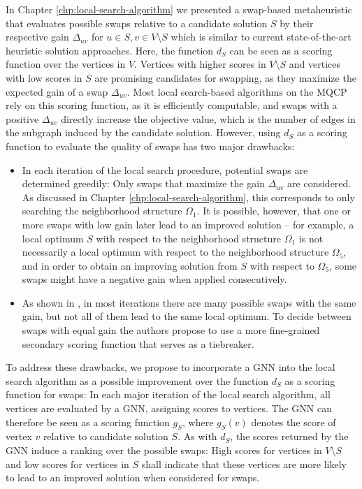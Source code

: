 \documentclass[draft,final]{vutinfth} %
\begin{document}
In Chapter \ref{chp:local-search-algorithm} we presented a swap-based metaheuristic that evaluates possible swaps relative to a candidate solution $S$ by their respective gain $\Delta_{uv}$ for $u \in S, v \in V \setminus S$ which is similar to current state-of-the-art heuristic solution approaches. 
Here, the function $d_S$ can be seen as a scoring function over the vertices in $V$. Vertices with higher scores in $V \setminus S$ and vertices with low scores in $S$ are promising candidates for swapping, as they maximize the expected gain of a swap $\Delta_{uv}$. 
Most local search-based algorithms on the MQCP rely on this scoring function, as it is efficiently computable, and swaps with a positive $\Delta_{uv}$ directly increase the objective value, which is the number of edges in the subgraph induced by the candidate solution. 
However, using $d_S$ as a scoring function to evaluate the quality of swaps has two major drawbacks:
\begin{itemize}
    \item In each iteration of the local search procedure, potential swaps are determined greedily: Only swaps that maximize the gain $\Delta_{uv}$ are considered. As discussed in Chapter \ref{chp:local-search-algorithm}, this corresponds to only searching the neighborhood structure $\Omega_1$. It is possible, however, that one or more swaps with low gain later lead to an improved solution -- for example, a local optimum $S$ with respect to the neighborhood structure $\Omega_1$ is not necessarily a local optimum with respect to the neighborhood structure $\Omega_5$, and in order to obtain an improving solution from $S$ with respect to $\Omega_5$, some swaps might have a negative gain when applied consecutively. 
    \item As shown in \cite{chen_nuqclq_2021}, in most iterations there are many possible swaps with the same gain, but not all of them lead to the same local optimum. To decide between swaps with equal gain the authors propose to use a more fine-grained secondary scoring function that serves as a tiebreaker. 
\end{itemize}

To address these drawbacks, we propose to incorporate a GNN into the local search algorithm as a possible improvement over the function $d_S$ as a scoring function for swaps: In each major iteration of the local search algorithm, all vertices are evaluated by a GNN, assigning scores to vertices. The GNN can therefore be seen as a scoring function $g_S$, where $g_S(v)$ denotes the score of vertex $v$ relative to candidate solution $S$. 
As with $d_S$, the scores returned by the GNN induce a ranking over the possible swaps: High scores for vertices in $V \setminus S$ and low scores for vertices in $S$ shall indicate that these vertices are more likely to lead to an improved solution when considered for swaps. 
\end{document}
